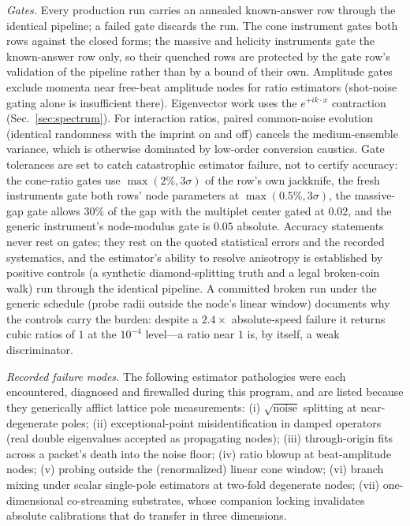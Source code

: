\documentclass[aps,prd,twocolumn,superscriptaddress,nofootinbib,floatfix]{revtex4-2}
\begin{document}
\emph{Gates.} Every production run carries an annealed known-answer row
through the identical pipeline; a failed gate discards the run. The
cone instrument gates both rows against the closed forms; the massive
and helicity instruments gate the known-answer row only, so their
quenched rows are protected by the gate row's validation of the
pipeline rather than by a bound of their own. Amplitude
gates exclude momenta near free-beat amplitude nodes for ratio estimators
(shot-noise gating alone is insufficient there). Eigenvector work uses the
$e^{+ik\cdot x}$ contraction (Sec.~\ref{sec:spectrum}). For interaction
ratios, paired common-noise evolution (identical randomness with the
imprint on and off) cancels the medium-ensemble variance, which is
otherwise dominated by low-order conversion caustics. Gate tolerances are
set to catch catastrophic estimator failure, not to certify accuracy:
the cone-ratio gates use $\max(2\%, 3\sigma)$ of the row's own
jackknife, the fresh instruments gate both rows' node parameters at
$\max(0.5\%,3\sigma)$, the massive-gap gate allows $30\%$ of the gap
with the multiplet center gated at $0.02$, and the generic instrument's
node-modulus gate is $0.05$ absolute. Accuracy statements never rest on gates;
they rest on the quoted statistical errors and the recorded systematics,
and the estimator's ability to resolve anisotropy is established by
positive controls (a synthetic diamond-splitting truth and a legal
broken-coin walk) run through the identical pipeline. A committed
broken run under the generic schedule (probe radii outside the node's
linear window) documents why the controls carry the burden: despite a
$2.4\times$ absolute-speed failure it returns cubic ratios of $1$ at
the $10^{-4}$ level---a ratio near $1$ is, by itself, a weak
discriminator.

\emph{Recorded failure modes.} The following estimator pathologies were
each encountered, diagnosed and firewalled during this program, and are
listed because they generically afflict lattice pole measurements:
(i) $\sqrt{\text{noise}}$ splitting at near-degenerate poles;
(ii) exceptional-point misidentification in damped operators (real double
eigenvalues accepted as propagating nodes);
(iii) through-origin fits across a packet's death into the noise floor;
(iv) ratio blowup at beat-amplitude nodes;
(v) probing outside the (renormalized) linear cone window;
(vi) branch mixing under scalar single-pole estimators at two-fold
degenerate nodes;
(vii) one-dimensional co-streaming substrates, whose companion locking
invalidates absolute calibrations that do transfer in three dimensions.
\end{document}
